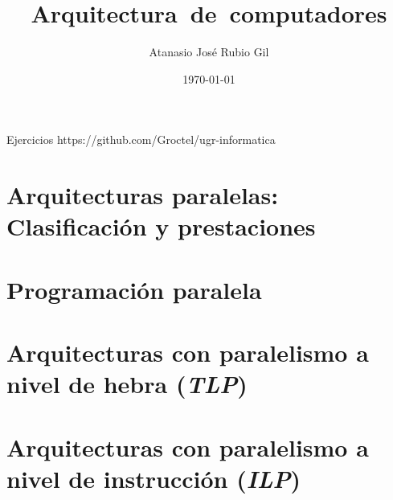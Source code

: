\documentclass[10pt]{report}
\author{Atanasio José Rubio Gil}
\title{Arquitectura~de~computadores}
\date{\today}
\begin{document}
            {Ejercicios}
            {https://github.com/Groctel/ugr-informatica}
\tableofcontents

\chapter{Arquitecturas paralelas: Clasificación y prestaciones}\label{arqpar-clasificacion-prestaciones}




\chapter{Programación paralela}\label{progpar}




\chapter{Arquitecturas con paralelismo a nivel de hebra (\textit{TLP})}\label{tlp}

\chapter{Arquitecturas con paralelismo a nivel de instrucción (\textit{ILP})}\label{ilp}
\end{document}
